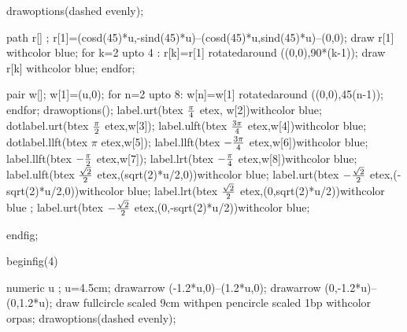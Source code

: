 \documentclass[12pt]{article}
\begin{document}
drawoptions(dashed evenly);

path r[] ;
r[1]=(cosd(45)*u,-sind(45)*u)--(cosd(45)*u,sind(45)*u)--(0,0);
draw r[1] withcolor blue;
for k=2 upto 4 : r[k]=r[1] rotatedaround ((0,0),90*(k-1));
  draw r[k] withcolor blue;
endfor;

pair w[];
w[1]=(u,0);
for n=2 upto 8:
  w[n]=w[1] rotatedaround ((0,0),45(n-1));
endfor;
drawoptions();
label.urt(btex ${\pi \over 4}$ etex, w[2])withcolor blue;
dotlabel.urt(btex ${\pi \over 2}$ etex,w[3]);
label.ulft(btex ${3\pi \over 4}$ etex,w[4])withcolor blue;
dotlabel.llft(btex ${\pi}$ etex,w[5]);
label.llft(btex $-{3\pi \over 4}$ etex,w[6])withcolor blue;
label.llft(btex $-{\pi \over 2}$ etex,w[7]);
label.lrt(btex $-{\pi \over 4}$ etex,w[8])withcolor blue;
label.ulft(btex ${\sqrt{2} \over 2}$ etex,(sqrt(2)*u/2,0))withcolor blue;
label.urt(btex $-{\sqrt{2} \over 2}$ etex,(-sqrt(2)*u/2,0))withcolor blue;
label.lrt(btex ${\sqrt{2} \over 2}$ etex,(0,sqrt(2)*u/2))withcolor blue ;
label.urt(btex $-{\sqrt{2} \over 2}$ etex,(0,-sqrt(2)*u/2))withcolor blue;

endfig;


beginfig(4)



 numeric u ;
 u=4.5cm;
 drawarrow (-1.2*u,0)--(1.2*u,0);
 drawarrow (0,-1.2*u)--(0,1.2*u);
 draw fullcircle scaled 9cm withpen pencircle scaled 1bp withcolor orpas;
 drawoptions(dashed evenly);

\end{document}

